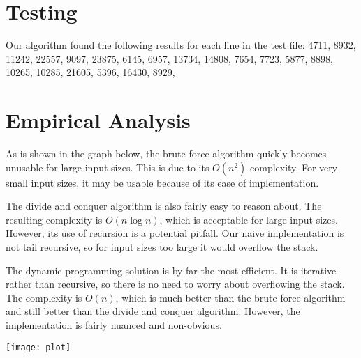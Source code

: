 \documentclass[12pt,letterpaper]{article}
\begin{document}
\section{Testing}
Our algorithm found the following results for each line in the test file: 4711,
8932, 11242, 22557, 9097, 23875, 6145, 6957, 13734, 14808, 7654, 7723, 5877,
8898, 10265, 10285, 21605, 5396, 16430, 8929, 

\section{Empirical Analysis}

As is shown in the graph below, the brute force algorithm quickly becomes
unusable for large input sizes. This is due to its $O(n^2)$ complexity. For very
small input sizes, it may be usable because of its ease of implementation.

The divide and conquer algorithm is also fairly easy to reason about. The
resulting complexity is $O(n\log n)$, which is acceptable for large input sizes.
However, its use of recursion is a potential pitfall. Our naive implementation
is not tail recursive, so for input sizes too large it would overflow the stack.

The dynamic programming solution is by far the most efficient. It is iterative
rather than recursive, so there is no need to worry about overflowing the stack.
The complexity is $O(n)$, which is much better than the brute force algorithm
and still better than the divide and conquer algorithm. However, the
implementation is fairly nuanced and non-obvious.

\texttt{[image: plot]}
\end{document}
